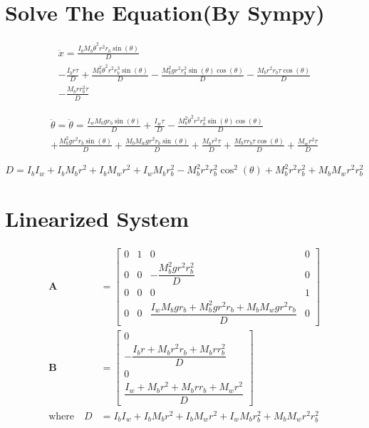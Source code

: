\documentclass[12pt]{article}
\begin{document}
\section*{Solve The Equation(By Sympy)}
\begin{multline*}
\ddot{x}= \frac{I_{b} M_{b} \dot{\theta}^{2} r^{2} r_{b} \sin{\left(\theta \right)}}{D} \\
- \frac{I_{b} r \tau}{D} + \frac{M_{b}^{2} \dot{\theta}^{2} r^{2} r_{b}^{3} \sin{\left(\theta \right)}}{D} - \frac{M_{b}^{2} g r^{2} r_{b}^{2} \sin{\left(\theta \right)} \cos{\left(\theta \right)}}{D} - \frac{M_{b} r^{2} r_{b} \tau \cos{\left(\theta \right)}}{D} \\
- \frac{M_{b} r r_{b}^{2} \tau}{D}
\end{multline*}

\begin{multline*}
\ddot{\theta} = 
\ddot{\theta}= \frac{I_{w} M_{b} g r_{b} \sin{\left(\theta \right)}}{D} + \frac{I_{w} \tau}{D} - \frac{M_{b}^{2} \dot{\theta}^{2} r^{2} r_{b}^{2} \sin{\left(\theta \right)} \cos{\left(\theta \right)}}{D} \\
+ \frac{M_{b}^{2} g r^{2} r_{b} \sin{\left(\theta \right)}}{D} + \frac{M_{b} M_{w} g r^{2} r_{b} \sin{\left(\theta \right)}}{D} + \frac{M_{b} r^{2} \tau}{D} + \frac{M_{b} r r_{b} \tau \cos{\left(\theta \right)}}{D} + \frac{M_{w} r^{2} \tau}{D}
\end{multline*}

\[
D = I_{b} I_{w} + I_{b} M_{b} r^{2} + I_{b} M_{w} r^{2} + I_{w} M_{b} r_{b}^{2} - M_{b}^{2} r^{2} r_{b}^{2} \cos^{2}{\left(\theta \right)} + M_{b}^{2} r^{2} r_{b}^{2} + M_{b} M_{w} r^{2} r_{b}^{2}
\]

\section*{Linearized System}
\begin{align*}
    \mathbf{A} &=
    \begin{bmatrix}
    0 & 1 & 0 & 0 \\[10pt]
    0 & 0 & -\dfrac{M_b^2 g r^2 r_b^2}{D} & 0 \\[10pt]
    0 & 0 & 0 & 1 \\[10pt]
    0 & 0 & \dfrac{I_w M_b g r_b + M_b^2 g r^2 r_b + M_b M_w g r^2 r_b}{D} & 0
    \end{bmatrix} \\[16pt]
    \mathbf{B} &=
    \begin{bmatrix}
    0 \\[10pt]
    - \dfrac{I_b r + M_b r^2 r_b + M_b r r_b^2}{D} \\[10pt]
    0 \\[10pt]
    \dfrac{I_w + M_b r^2 + M_b r r_b + M_w r^2}{D}
    \end{bmatrix} \\[16pt]
    \text{where} \quad
    D &= I_b I_w + I_b M_b r^2 + I_b M_w r^2 + I_w M_b r_b^2 + M_b M_w r^2 r_b^2
\end{align*}
    
  
\end{document}
